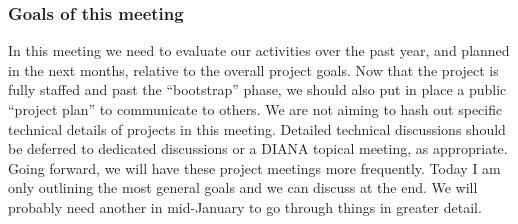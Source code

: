 \begin{frame}
\frametitle{Goals of this meeting}

In this meeting we need to evaluate our activities over the past year, and planned in the next months, relative to the overall project goals. 
\vskip 0.15in
Now that the project is fully staffed and past the ``bootstrap'' phase, we should also put in place a public ``project plan'' to communicate to others.
\vskip 0.15in
We are not aiming to hash out specific technical details of projects in this meeting. Detailed technical discussions should be deferred to dedicated discussions or a DIANA topical meeting, as appropriate.
\vskip 0.15in
Going forward, we will have these project meetings more frequently. Today I am only outlining the most general goals and we can discuss at the end. We will
probably need another in mid-January to go through things in greater detail.
\vskip 0.15in
\end{frame}


